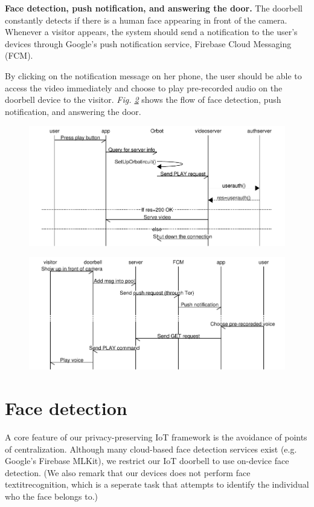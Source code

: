 \textbf{Face detection, push notification, and answering the door.} The doorbell constantly detects if there is a human face appearing in front of the camera. Whenever a visitor appears, the system should send a notification to the user's devices through Google's push notification service, Firebase Cloud Messaging (FCM).

By clicking on the notification message on her phone, the user should be able to access the video immediately and choose to play pre-recorded audio on the doorbell device to the visitor.
\textit{Fig. \ref{fig:push}} shows the flow of face detection, push notification, and answering the door.


\begin{figure}
	\includegraphics[width=\linewidth]{Sequence_diagram_playvideo.pdf}
	\caption{}
	\label{fig:playvideo}
\end{figure}
\begin{figure}
	\includegraphics[width=\linewidth]{Sequence_diagram_push.pdf}
	\caption{}
	\label{fig:push}
\end{figure}


\section{Face detection}
A core feature of our privacy-preserving IoT framework is the avoidance of points of centralization. Although many cloud-based face detection services exist (e.g. Google's Firebase MLKit), we restrict our IoT doorbell to use on-device face detection. (We also remark that our devices does not perform face textit{recognition}, which is a seperate task that attempts to identify the individual who the face belongs to.) 


